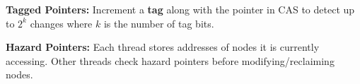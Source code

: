 \begin{definition}
\textbf{Tagged Pointers:} Increment a \textbf{tag} along with the pointer in CAS to detect up to $2^k$ changes where $k$ is the number of tag bits.
\end{definition}

\begin{definition}
\textbf{Hazard Pointers:} Each thread stores addresses of nodes it is currently accessing. Other threads check hazard pointers before modifying/reclaiming nodes.
\end{definition}
